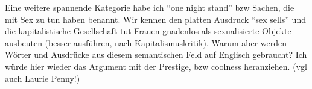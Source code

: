 \begin{comment}
      "By contrast, it was by opposing a social capitalism planned and supervised by the state - treated as obsolete, cramped and constraining - and leaning on the artistic critique (autonomy and creativity) that the new spirit of capitalism gradually took shape at the end of the crisis of the 1960s and 1970s, and undertook to restore the prestige of capitalism. Turning its back on the social demands that had dominated the first half of the 1970s, the new spirit was receptive to the critiques of the period that denounced the mechanization of the world (post-industrial society against industrial society) - the destruction of forms of life conductive to the fulfilment of specifically human potential and, in particular, creativity - and stressed the intolerable character of the .. of oppression which, without necessarily deriving directly from historical capitalism, had been exploited by capitalis mechanisms for organizing .." (p.201)
      "By adapting these sets of demands to the description of a new, liberated and even libertarian way of making profit - which was also said to allow for realization of the self and its most personal aspirations.." (p.201)
      "By helping to overthrow the conventions bound up with the old domestic world, and also to overcome the inflexibilities of the industrial order - bureaucratic hierarchies and standardized production - the artistic critique opened up an opportunity for capitalism to base itself on new forms of control and commodify new, more individualized and 'authentic' goods." (p.467, The Test of the Artistic Critique)
\end{comment}

Eine weitere spannende Kategorie habe ich ``one night stand'' bzw Sachen, die mit Sex zu tun haben benannt.
Wir kennen den platten Ausdruck ``sex sells'' und die kapitalistische Gesellschaft tut Frauen gnadenlos als sexualisierte Objekte ausbeuten (besser ausführen, nach Kapitalismuskritik).
Warum aber werden Wörter und Ausdrücke aus diesem semantischen Feld auf Englisch gebraucht?
Ich würde hier wieder das Argument mit der Prestige, bzw coolness heranziehen. (vgl auch Laurie Penny!)

